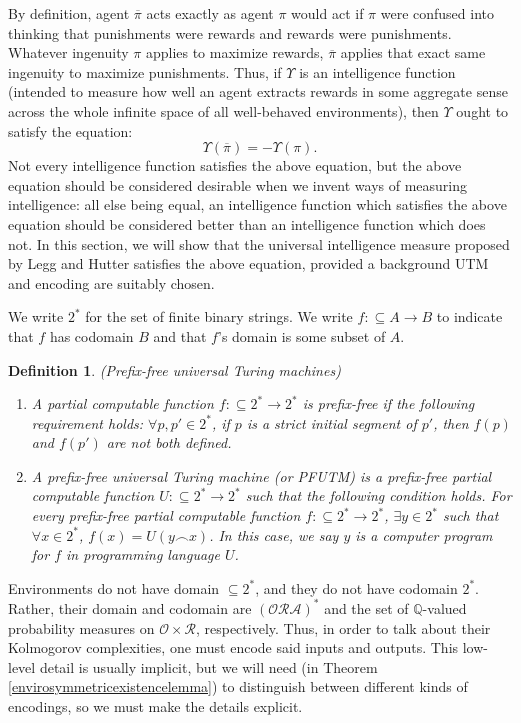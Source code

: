 \documentclass[runningheads]{llncs}
\newtheorem{mydefinition}[mytheorem]{Definition}
\begin{document}
By definition, agent $\overline\pi$ acts exactly as agent $\pi$ would
act if $\pi$ were confused into thinking that punishments were rewards
and rewards were punishments.
Whatever ingenuity $\pi$ applies to maximize rewards,
$\overline\pi$ applies that exact same ingenuity to maximize punishments.
Thus, if $\Upsilon$ is an intelligence function (intended to measure how
well an agent extracts rewards in some aggregate sense across the whole
infinite space of all well-behaved environments), then $\Upsilon$ ought
to satisfy the equation:
\[
    \Upsilon(\overline\pi) = -\Upsilon(\pi).
\]
Not every intelligence function satisfies the above equation, but the
above equation should be considered desirable when we
invent ways of measuring intelligence: all else being equal, an
intelligence function which satisfies the above equation should be
considered better than an intelligence function which does
not.
In this section, we will show that the universal intelligence measure
proposed by Legg and Hutter satisfies the above equation, provided a
background UTM and encoding are suitably chosen.

We write $2^*$ for the set of finite binary strings.
We write $f:\subseteq A\to B$ to indicate that $f$ has codomain $B$
and that $f$'s domain is some subset of $A$.

\begin{mydefinition}
    (Prefix-free universal Turing machines)
    \begin{enumerate}
        \item A partial computable function $f:\subseteq 2^*\to 2^*$
        is \emph{prefix-free} if the following requirement holds:
        $\forall p,p'\in 2^*$, if $p$ is a strict initial segment of $p'$,
        then $f(p)$ and $f(p')$ are not both defined.
        \item A \emph{prefix-free universal Turing machine}
        (or \emph{PFUTM}) is a prefix-free
        partial computable function $U:\subseteq 2^*\to 2^*$
        such that the following condition holds.
        For every prefix-free partial computable function
        $f:\subseteq 2^*\to 2^*$, $\exists y\in 2^*$ such that
        $\forall x\in 2^*$, $f(x)=U(y\frown x)$.
        In this case, we say $y$ is a \emph{computer program for
        $f$ in programming language $U$}.
    \end{enumerate}
\end{mydefinition}

Environments do not have domain $\subseteq 2^*$, and they do not
have codomain $2^*$.
Rather, their domain and codomain are $(\mathcal O\mathcal R\mathcal A)^*$
and the set of $\mathbb Q$-valued probability measures on $\mathcal O\times\mathcal R$,
respectively.
Thus, in order to talk about their Kolmogorov complexities,
one must encode said inputs and outputs. This low-level detail is
usually implicit, but we will need (in Theorem \ref{envirosymmetricexistencelemma})
to distinguish between different kinds of encodings, so we must make the
details explicit.
\end{document}
